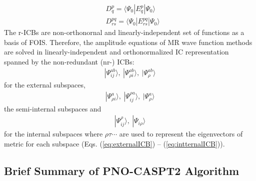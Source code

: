 \documentclass[aip,jcp,amsmath,twocolumn,floatfix,reprint,fleqn]{revtex4-1}
\begin{document}
%
\begin{align}
  &D^{p}_{q} = \langle\Psi_0|E^{p}_{q}|\Psi_0\rangle  \\
  &D^{pq}_{rs} = \langle\Psi_0|E^{pq}_{rs}|\Psi_0\rangle
\end{align}
%
The r-ICBs are non-orthonornal and linearly-independent set of functions as a basis of FOIS.
%
Therefore, the amplitude equations of MR wave function methods are solved in linearly-independent and orthonormalized IC representation spanned by the non-redundant (nr-) ICBs:
%
\begin{align}
  |\Psi_{ij}^{ab}\rangle,\ |\Psi_{\rho i}^{ab}\rangle,\ |\Psi_{\rho}^{ab}\rangle 
\end{align}
%
for the external subspaces,
%
\begin{align}
  |\Psi_{\rho i}^{a}\rangle,\ |\Psi_{ij}^{\rho a}\rangle,\ |\Psi_{\rho}^{a}\rangle
\end{align}
%
the semi-internal subspaces and
%
\begin{align}
  |\Psi_{ij}^{\rho}\rangle,\ |\Psi_{i\rho}\rangle
\end{align}
%
for the internal subspaces where $\rho\tau\cdots$ are used to represent the eigenvectors of metric for each subspace (Eqs. (\ref{eq:externalICB}) -- (\ref{eq:intternalICB})).

\subsection{Brief Summary of PNO-CASPT2 Algorithm}
\end{document}
